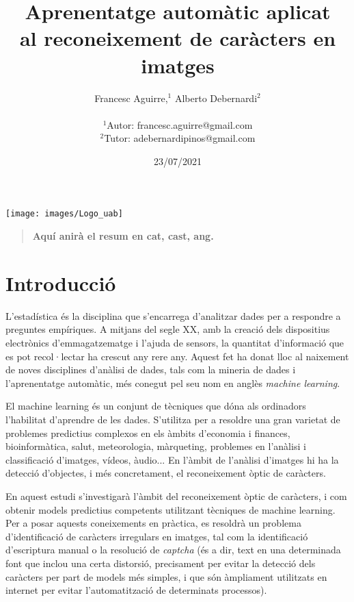 \documentclass[12pt, spanish]{article}
\title{Aprenentatge automàtic aplicat \\ al reconeixement de caràcters en imatges}
\author
{Francesc Aguirre,$^{1}$  Alberto Debernardi$^{2}$\\
\\
\normalsize{$^{1}$Autor: francesc.aguirre@gmail.com}\\
\normalsize{$^{2}$Tutor: adebernardipinos@gmail.com}\\
}
\date{23/07/2021}
\newenvironment{sciabstract}{%
\begin{quote} \bf}
{\end{quote}}
\begin{document}
 

\baselineskip24pt

\maketitle 

\baselineskip24pt

\begin{center}
	\texttt{[image: images/Logo\_uab]}\par\vspace{1cm}
\end{center}

\clearpage



\begin{sciabstract}
  Aquí anirà el resum en cat, cast, ang.
\end{sciabstract}

\clearpage

\tableofcontents

\clearpage

\section{Introducció}

L'estadística és la disciplina que s'encarrega d'analitzar dades per a respondre a preguntes empíriques. A mitjans del segle XX, amb la creació dels dispositius electrònics d'emmagatzematge i l'ajuda de sensors, la quantitat d'informació que es pot recol·lectar ha crescut any rere any. Aquest fet ha donat lloc al naixement de noves disciplines d'anàlisi de dades, tals com la mineria de dades i l'aprenentatge automàtic, més conegut pel seu nom en anglès \textit{machine learning}.

El machine learning és un conjunt de tècniques que dóna als ordinadors l'habilitat d'aprendre de les dades. S'utilitza per a resoldre una gran varietat de problemes predictius complexos en els àmbits d'economia i finances, bioinformàtica, salut, meteorologia, màrqueting, problemes en l'anàlisi i classificació d'imatges, vídeos, àudio... En l'àmbit de l'anàlisi d'imatges hi ha la detecció d'objectes, i més concretament, el reconeixement òptic de caràcters. 

En aquest estudi s'investigarà l'àmbit del reconeixement òptic de caràcters, i com obtenir models predictius competents utilitzant tècniques de machine learning. Per a posar aquests coneixements en pràctica, es resoldrà un problema d'identificació de caràcters irregulars en imatges, tal com la identificació d'escriptura manual o la resolució de \textit{captcha} (és a dir, text en una determinada font que inclou una certa distorsió, precisament per evitar la detecció dels caràcters per part de models més simples, i que són àmpliament utilitzats en internet per evitar l'automatització de determinats processos).
\end{document}
